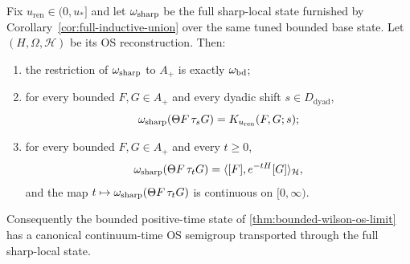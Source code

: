 \begin{theorem}\label{thm:continuum-time-os-upgrade}
Fix $u_{\mathrm{ren}}\in(0,u_*]$ and let $\omega_{\mathrm{sharp}}$ be the full sharp-local state furnished by Corollary~\ref{cor:full-inductive-union} over the same tuned bounded base state. Let $(H,\Omega,\mathcal H)$ be its OS reconstruction. Then:
\begin{enumerate}[label=\textup{(\roman*)},leftmargin=2.25em]
\item the restriction of $\omega_{\mathrm{sharp}}$ to $A_+$ is exactly $\omega_{\mathrm{bd}}$;
\item for every bounded $F,G\in A_+$ and every dyadic shift $s\in D_{\mathrm{dyad}}$,
\[
\omega_{\mathrm{sharp}}(\Theta F\,\tau_s G)=K_{u_{\mathrm{ren}}}(F,G;s);
\]
\item for every bounded $F,G\in A_+$ and every $t\ge 0$,
\[
\omega_{\mathrm{sharp}}(\Theta F\,\tau_t G)=\langle [F],e^{-tH}[G]\rangle_{\mathcal H},
\]
and the map $t\mapsto \omega_{\mathrm{sharp}}(\Theta F\,\tau_t G)$ is continuous on $[0,\infty)$.
\end{enumerate}
Consequently the bounded positive-time state of \cref{thm:bounded-wilson-os-limit} has a canonical continuum-time OS semigroup transported through the full sharp-local state.
\end{theorem}

